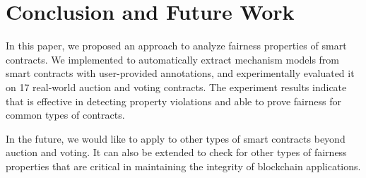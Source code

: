 
\section{Conclusion and Future Work}\label{Sec_Conclusion}
In this paper, we proposed an approach to analyze fairness properties of smart
contracts.
We implemented \faircon to automatically extract mechanism models from smart contracts with
user-provided annotations, and experimentally evaluated it on 17 real-world auction and
voting contracts.
The experiment results indicate that \faircon is effective in detecting property violations
and able to prove fairness for common types of contracts.

In the future, we would like to apply \faircon to other types of smart contracts beyond
auction and voting.
It can also be extended to check for other types of fairness properties that are critical
in maintaining the integrity of blockchain applications.

